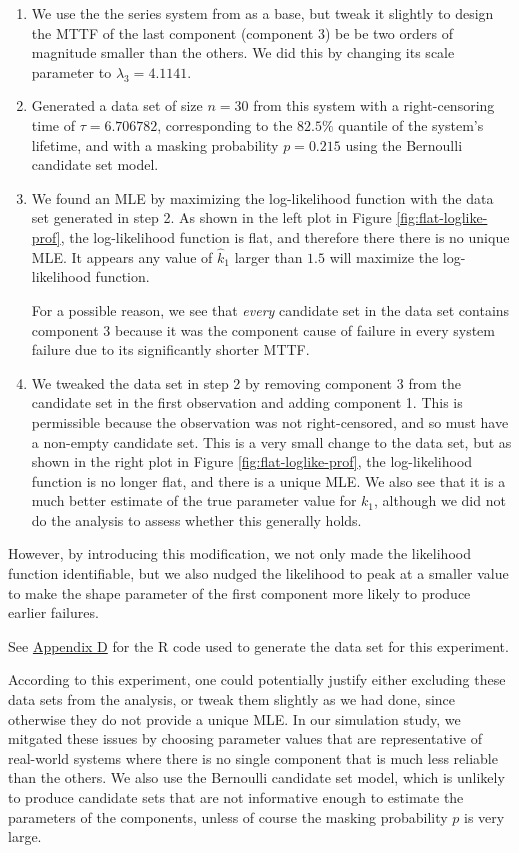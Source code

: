 \documentclass[
]{article}
\begin{document}
\begin{enumerate}
\def\labelenumi{\arabic{enumi}.}
\item
  We use the the series system from \citep{Huairu-2013} as a base, but
  tweak it slightly to design the MTTF of the last component (component
  3) be be two orders of magnitude smaller than the others. We did this
  by changing its scale parameter to \(\lambda_3 = 4.1141\).
\item
  Generated a data set of size \(n = 30\) from this system with a
  right-censoring time of \(\tau = 6.706782\), corresponding to the
  \(82.5\%\) quantile of the system's lifetime, and with a masking
  probability \(p = 0.215\) using the Bernoulli candidate set model.
\item
  We found an MLE by maximizing the log-likelihood function with the
  data set generated in step 2. As shown in the left plot in Figure
  \ref{fig:flat-loglike-prof}, the log-likelihood function is flat, and
  therefore there there is no unique MLE. It appears any value of
  \(\hat k_1\) larger than \(1.5\) will maximize the log-likelihood
  function.

  For a possible reason, we see that \emph{every} candidate set in the
  data set contains component 3 because it was the component cause of
  failure in every system failure due to its significantly shorter MTTF.
\item
  We tweaked the data set in step 2 by removing component 3 from the
  candidate set in the first observation and adding component 1. This is
  permissible because the observation was not right-censored, and so
  must have a non-empty candidate set. This is a very small change to
  the data set, but as shown in the right plot in Figure
  \ref{fig:flat-loglike-prof}, the log-likelihood function is no longer
  flat, and there is a unique MLE. We also see that it is a much better
  estimate of the true parameter value for \(k_1\), although we did not
  do the analysis to assess whether this generally holds.
\end{enumerate}

However, by introducing this modification, we not only made the
likelihood function identifiable, but we also nudged the likelihood to
peak at a smaller value to make the shape parameter of the first
component more likely to produce earlier failures.

See \hyperref[app:flat-like-code]{Appendix D} for the R code used to
generate the data set for this experiment.

According to this experiment, one could potentially justify either
excluding these data sets from the analysis, or tweak them slightly as
we had done, since otherwise they do not provide a unique MLE. In our
simulation study, we mitgated these issues by choosing parameter values
that are representative of real-world systems where there is no single
component that is much less reliable than the others. We also use the
Bernoulli candidate set model, which is unlikely to produce candidate
sets that are not informative enough to estimate the parameters of the
components, unless of course the masking probability \(p\) is very
large.
\end{document}
